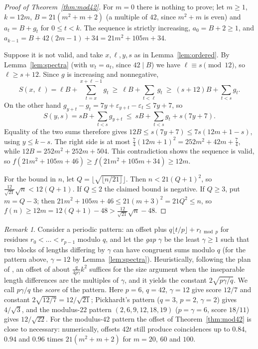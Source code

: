 \documentclass[11pt]{amsart}
\theoremstyle{remark}
\newtheorem{remark}[theorem]{Remark}
\newcommand{\isqrt}[1]{\lfloor\sqrt{#1}\rfloor}
\begin{document}
\begin{proof}[Proof of Theorem~\ref{thm:mod42}]
For $m=0$ there is nothing to prove; let $m\ge1$, $k=12m$, $B=21(m^2+m+2)$ (a multiple of $42$, since $m^2+m$ is even) and
$a_t=B+g_t$ for $0\le t<k$. The sequence is strictly increasing, $a_0=B+2\ge1$, and
$a_{k-1}=B+42(2m-1)+34=21m^2+105m+34$.

Suppose it is not valid, and take $x,\ell,y,s$ as in Lemma~\ref{lem:ordered}. By Lemma~\ref{lem:spectra} (with $w_t=a_t$, since $42\mid B$)
we have $\ell\equiv s\pmod{12}$, so $\ell\ge s+12$. Since $g$ is increasing and nonnegative,
\[
  S(x,\ell)=\ell B+\sum_{t=x}^{x+\ell-1}g_t\ \ge\ \ell B+\sum_{t<\ell}g_t\ \ge\ (s+12)B+\sum_{t<s}g_t .
\]
On the other hand $g_{y+t}-g_t=7y+\varepsilon_{y+t}-\varepsilon_t\le7y+7$, so
\[
  S(y,s)=sB+\sum_{t<s}g_{y+t}\ \le\ sB+\sum_{t<s}g_t+s(7y+7).
\]
Equality of the two sums therefore gives $12B\le s(7y+7)\le 7s(12m+1-s)$, using $y\le k-s$. The right side is at most
$\frac74(12m+1)^2=252m^2+42m+\frac74$, while $12B=252m^2+252m+504$. This contradiction shows the sequence is valid, so
$f(21m^2+105m+46)\ge f(21m^2+105m+34)\ge12m$.

For the bound in $n$, let $Q=\isqrt{\lfloor n/21\rfloor}$. Then $n<21(Q+1)^2$, so $\frac{12}{\sqrt{21}}\sqrt n<12(Q+1)$. If
$Q\le2$ the claimed bound is negative. If $Q\ge3$, put $m=Q-3$; then $21m^2+105m+46\le21(m+3)^2=21Q^2\le n$, so
$f(n)\ge12m=12(Q+1)-48>\frac{12}{\sqrt{21}}\sqrt n-48$.
\end{proof}

\begin{remark}\label{rem:score}
Consider a periodic pattern: an offset plus $q\lfloor t/p\rfloor+r_{t\bmod p}$ for residues $r_0<\dots<r_{p-1}$ modulo $q$, and let the
\emph{gap} $\gamma$ be the least $\gamma\ge1$ such that two blocks of lengths differing by $\gamma$ can have congruent sums modulo $q$ (for
the pattern above, $\gamma=12$ by Lemma~\ref{lem:spectra}). Heuristically, following the plan of \cite{Pickhardt2026}, an offset of about
$\frac{q}{4p\gamma}k^2$ suffices for the size argument when the inseparable length differences are the multiples of $\gamma$, and it
yields the constant $2\sqrt{p\gamma/q}$. We call $p\gamma/q$ the \emph{score} of the pattern. Here $p=6$, $q=42$, $\gamma=12$ give score
$12/7$ and constant $2\sqrt{12/7}=12/\sqrt{21}$; Pickhardt's pattern ($q=3$, $p=2$, $\gamma=2$) gives $4/\sqrt3$, and the modulus-$22$
pattern $(2,6,9,12,18,19)$ ($p=\gamma=6$, score $18/11$) gives $12/\sqrt{22}$. For the modulus-$42$ pattern the offset of
Theorem~\ref{thm:mod42} is close to necessary: numerically, offsets $42t$ still produce coincidences up to $0.84$, $0.94$ and $0.96$
times $21(m^2+m+2)$ for $m=20$, $60$ and $100$.
\end{remark}
\end{document}
